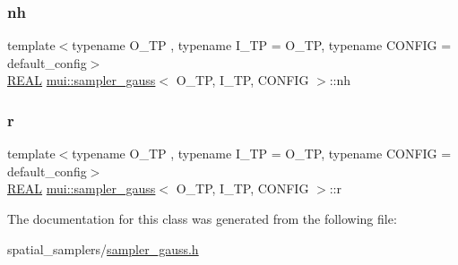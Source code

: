 \mbox{\label{classmui_1_1sampler__gauss_a7eb858ff7405261598928e734e520353}} 
\subsubsection{\texorpdfstring{nh}{nh}}
{\footnotesize\ttfamily template$<$typename O\+\_\+\+TP , typename I\+\_\+\+TP  = O\+\_\+\+TP, typename C\+O\+N\+F\+IG  = default\+\_\+config$>$ \\
\hyperlink{classmui_1_1sampler__gauss_a35a01ac5eb1f9f41dc5642844a43366b}{R\+E\+AL} \hyperlink{classmui_1_1sampler__gauss}{mui\+::sampler\+\_\+gauss}$<$ O\+\_\+\+TP, I\+\_\+\+TP, C\+O\+N\+F\+IG $>$\+::nh\hspace{0.3cm}{\ttfamily [protected]}}

\mbox{\label{classmui_1_1sampler__gauss_a70ab0b527d9c42f8b00c0722e1172f8f}} 
\subsubsection{\texorpdfstring{r}{r}}
{\footnotesize\ttfamily template$<$typename O\+\_\+\+TP , typename I\+\_\+\+TP  = O\+\_\+\+TP, typename C\+O\+N\+F\+IG  = default\+\_\+config$>$ \\
\hyperlink{classmui_1_1sampler__gauss_a35a01ac5eb1f9f41dc5642844a43366b}{R\+E\+AL} \hyperlink{classmui_1_1sampler__gauss}{mui\+::sampler\+\_\+gauss}$<$ O\+\_\+\+TP, I\+\_\+\+TP, C\+O\+N\+F\+IG $>$\+::r\hspace{0.3cm}{\ttfamily [protected]}}



The documentation for this class was generated from the following file\+:\begin{DoxyCompactItemize}
\item 
spatial\+\_\+samplers/\hyperlink{sampler__gauss_8h}{sampler\+\_\+gauss.\+h}\end{DoxyCompactItemize}
